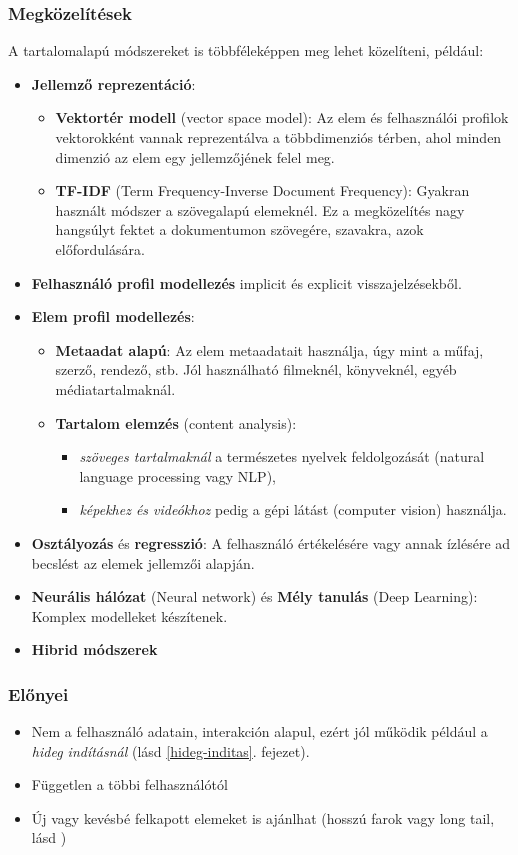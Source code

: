 \documentclass[
]{thesis-ekf}
\theoremstyle{definition}
\theoremstyle{remark}
\begin{document}
\subsubsection{Megközelítések}
A tartalomalapú módszereket is többféleképpen meg lehet közelíteni, például: 
\begin{itemize}
	\item \textbf{Jellemző reprezentáció}:
	\begin{itemize}
		\item \textbf{Vektortér modell} (vector space model): Az elem és felhasználói profilok vektorokként vannak reprezentálva a többdimenziós térben, ahol minden dimenzió az elem egy jellemzőjének felel meg.
		\item \textbf{TF-IDF} (Term Frequency-Inverse Document Frequency): Gyakran használt módszer a szövegalapú elemeknél. Ez a megközelítés nagy hangsúlyt fektet a dokumentumon szövegére, szavakra, azok előfordulására.\cite{wiki-tf-idf}
	\end{itemize}
	\item \textbf{Felhasználó profil modellezés} implicit és explicit visszajelzésekből.
	\item \textbf{Elem profil modellezés}: 
	\begin{itemize}
		\item \textbf{Metaadat alapú}: Az elem metaadatait használja, úgy mint a műfaj, szerző, rendező, stb. Jól használható filmeknél, könyveknél, egyéb médiatartalmaknál.
		\item \textbf{Tartalom elemzés} (content analysis): 
		\begin{itemize}
			\item \emph{szöveges tartalmaknál} a természetes nyelvek feldolgozását (natural language processing vagy NLP),
			\item \emph{képekhez és videókhoz} pedig a gépi látást (computer vision) használja.
		\end{itemize} 
	\end{itemize}
	\item \textbf{Osztályozás} és \textbf{regresszió}: A felhasználó értékelésére vagy annak ízlésére ad becslést az elemek jellemzői alapján.
	\item \textbf{Neurális hálózat} (Neural network) és \textbf{Mély tanulás} (Deep Learning): Komplex modelleket készítenek.
	\item \textbf{Hibrid módszerek}
\end{itemize}
\cite{wiki-recommender-system}
\subsubsection{Előnyei}
\begin{itemize}
	\item Nem a felhasználó adatain, interakción alapul, ezért jól működik például a \emph{hideg indításnál} (lásd \ref{hideg-inditas}. fejezet).
	\item Független a többi felhasználótól
	\item Új vagy kevésbé felkapott elemeket is ajánlhat (hosszú farok vagy long tail, lásd \cite{wiki-hosszu-farok})\cite{werner-ajanlo-rendszer}
\end{itemize}
\end{document}
